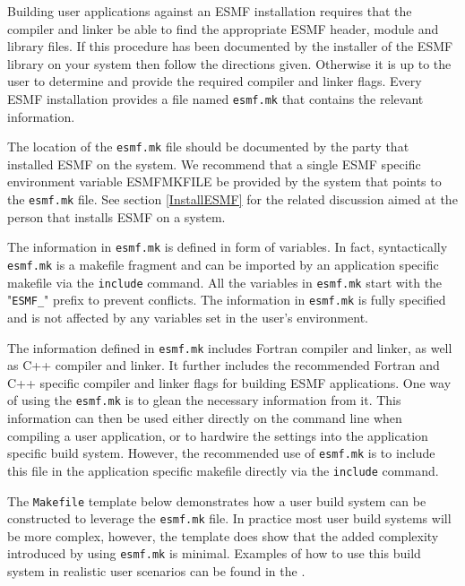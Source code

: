 
Building user applications against an ESMF installation requires that the compiler and linker be able to find the appropriate ESMF header, module and library files. If this procedure has been documented by the installer of the ESMF library on your system then follow the directions given. Otherwise it is up to the user to determine and provide the required compiler and linker flags. Every ESMF installation provides a file named {\tt esmf.mk} that contains the relevant information.

The location of the {\tt esmf.mk} file should be documented by the party that installed ESMF on the system. We recommend that a single ESMF specific environment variable ESMFMKFILE be provided by the system that points to the {\tt esmf.mk} file. See section \ref{InstallESMF} for the related discussion aimed at the person that installs ESMF on a system.

The information in {\tt esmf.mk} is defined in form of variables. In fact, syntactically {\tt esmf.mk} is a makefile fragment and can be imported by an application specific makefile via the {\tt include} command. All the variables in {\tt esmf.mk} start with the "{\tt ESMF\_}" prefix to prevent conflicts. The information in {\tt esmf.mk} is fully specified and is not affected by any variables set in the user's environment.

The information defined in {\tt esmf.mk} includes Fortran compiler and linker, as well as C++ compiler and linker. It further includes the recommended Fortran and C++ specific compiler and linker flags for building ESMF applications. One way of using the {\tt esmf.mk} is to glean the necessary information from it. This information can then be used either directly on the command line when compiling a user application, or to hardwire the settings into the application specific build system. However, the recommended use of {\tt esmf.mk} is to include this file in the application specific makefile directly via the {\tt include} command.

The {\tt Makefile} template below demonstrates how a user build system can be constructed to leverage the {\tt esmf.mk} file. In practice most user build systems will be more complex, however, the template does show that the added complexity introduced by using {\tt esmf.mk} is minimal. Examples of how to use this build system in realistic user scenarios can be found in the .

